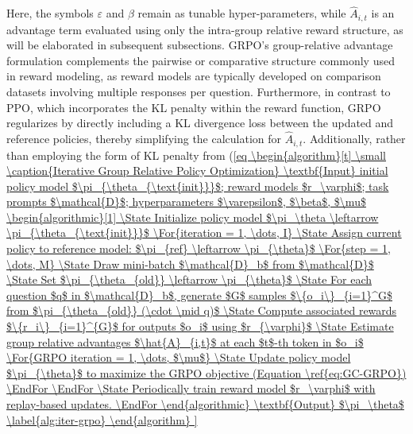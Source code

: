 Here, the symbols $\varepsilon$ and $\beta$ remain as tunable hyper-parameters, while $\hat{A}_{i,t}$ is an advantage term evaluated using only the intra-group relative reward structure, as will be elaborated in subsequent subsections. GRPO's group-relative advantage formulation complements the pairwise or comparative structure commonly used in reward modeling, as reward models are typically developed on comparison datasets involving multiple responses per question. Furthermore, in contrast to PPO, which incorporates the KL penalty within the reward function, GRPO regularizes by directly including a KL divergence loss between the updated and reference policies, thereby simplifying the calculation for $\hat{A}_{i,t}$. Additionally, rather than employing the form of KL penalty from (\ref{eq

\begin{algorithm}[t]
  \small
  \caption{Iterative Group Relative Policy Optimization}
  \textbf{Input} initial policy model $\pi_{\theta_{\text{init}}}$; reward models $r_\varphi$; task prompts $\mathcal{D}$; 
  hyperparameters $\varepsilon$, $\beta$, $\mu$
  \begin{algorithmic}[1]
    \State Initialize policy model $\pi_\theta \leftarrow \pi_{\theta_{\text{init}}}$
    \For{iteration = 1, \dots, I}
      \State Assign current policy to reference model: $\pi_{ref} \leftarrow \pi_{\theta}$
      \For{step = 1, \dots, M}
        \State Draw mini-batch $\mathcal{D}_b$ from $\mathcal{D}$
        \State Set $\pi_{\theta_{old}} \leftarrow \pi_{\theta}$ 
        \State For each question $q$ in $\mathcal{D}_b$, generate $G$ samples $\{o_i\}_{i=1}^G$ from $\pi_{\theta_{old}} (\cdot \mid q)$
        \State Compute associated rewards $\{r_i\}_{i=1}^{G}$ for outputs $o_i$ using $r_{\varphi}$
        \State Estimate group relative advantages $\hat{A}_{i,t}$ at each $t$-th token in $o_i$
        \For{GRPO iteration = 1, \dots, $\mu$}
          \State Update policy model $\pi_{\theta}$ to maximize the GRPO objective (Equation \ref{eq:GC-GRPO})
        \EndFor
      \EndFor 
      \State Periodically train reward model $r_\varphi$ with replay-based updates.
    \EndFor 
  \end{algorithmic}
  \textbf{Output} $\pi_\theta$
  \label{alg:iter-grpo}
\end{algorithm}

}
